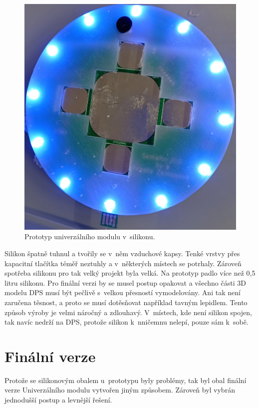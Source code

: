 \begin{figure}[!h]
  \begin{center}
    \includegraphics[scale=0.12]{obrazky/DPS_prototyp_v_silikonu.jpg}
  \end{center}
  \caption[Prototyp univerzálního modulu v~silikonu]{Prototyp univerzálního modulu v~silikonu.}
\end{figure}

Silikon špatně tuhnul a tvořily se v~něm vzduchové kapsy. Tenké vrstvy přes kapacitní tlačítka téměř neztuhly a v~některých místech se potrhaly. Zároveň spotřeba silikonu pro tak velký projekt byla velká. 
Na prototyp padlo více než 0,5 litru silikonu. Pro finální verzi by se musel postup opakovat a všechno části 3D modelu DPS musí být pečlivě s~velkou přesností vymodelovány. Ani tak není zaručena těsnost,
a proto se musí dotěsňovat například tavným lepidlem. Tento způsob výroby je velmi náročný a zdlouhavý. V~místech, kde není silikon spojen, tak navíc nedrží na DPS, protože silikon k~nničemnu nelepí, pouze 
sám k~sobě. 

\section{Finální verze}
Protože se silikonovým obalem u~prototypu byly problémy, tak byl obal finální verze Univerzálního modulu vytvořen jiným způsobem. Zároveň byl vybrán jednodušší postup a levnější řešení. 

